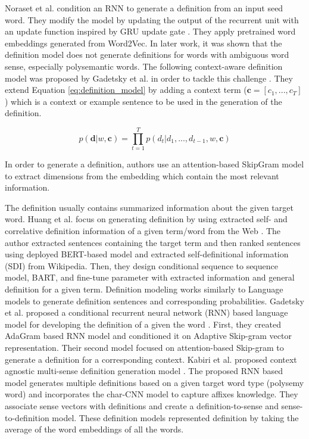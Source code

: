 Noraset et al. condition an RNN to generate a definition from an input seed word.
They modify the model by updating the output of the recurrent unit with an
update function inspired by GRU update gate \cite{noraset_definition_2016}. They
apply pretrained word embeddings generated from Word2Vec. In later work, it was
shown that the definition model does not generate definitions for words with
ambiguous word sense, especially polysemantic words. The following context-aware
definition model was proposed by Gadetsky et al. in order to tackle this
challenge \cite{gadetsky_conditional_2018}. They extend Equation
\ref{eq:definition_model} by adding a context term ($\textbf{c} = [c_1, ...,
    c_T]$) which is a context or example sentence to be used in the generation of
the definition.

\begin{equation}
    \label{eq:context_aware_definition_model}
    p(\textbf{d} | w, \textbf{c}) = \prod_{t=1}^{T} p(d_t | d_1,...,d_{t-1}, w, \textbf{c})
\end{equation}

In order to generate a definition, authors use an attention-based SkipGram model
to extract dimensions from the embedding which contain the most relevant
information.

The definition usually contains summarized information about the given target
word. Huang et al. focus on generating definition by using extracted self- and
correlative definition information of a given term/word from the Web
\cite{huang_cdm_2021}. The author extracted sentences containing the target term
and then ranked sentences using deployed BERT-based model and extracted
self-definitional information (SDI) from Wikipedia. Then, they design
conditional sequence to sequence model, BART, and fine-tune parameter with
extracted information and general definition for a given term. Definition
modeling works similarly to Language models to generate definition sentences and
corresponding probabilities. Gadetsky et al. proposed a conditional recurrent
neural network (RNN) based language model for developing the definition of a
given the word \cite{gadetsky_conditional_2018}. First, they created AdaGram
based RNN model and conditioned it on Adaptive Skip-gram vector representation.
Their second model focused on attention-based Skip-gram to generate a definition
for a corresponding context. Kabiri et al. proposed context agnostic multi-sense
definition generation model \cite{kabiri_evaluating_2020}. The proposed RNN
based model generates multiple definitions based on a given target word type
(polysemy word) and incorporates the char-CNN model to capture affixes
knowledge. They associate sense vectors with definitions and create a
definition-to-sense and sense-to-definition model. These definition models
represented definition by taking the average of the word embeddings of all the
words.


